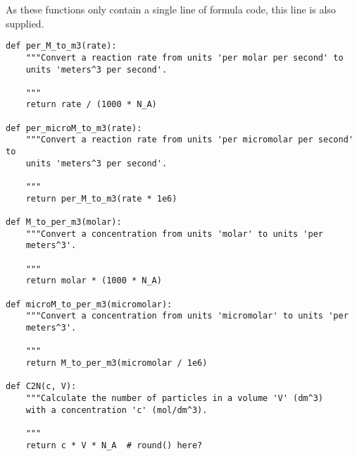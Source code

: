 \documentclass[a4paper,10pt]{article}
\begin{document}
As these functions only contain a single line of formula code, this line is also supplied.
\begin{verbatim}
def per_M_to_m3(rate):
    """Convert a reaction rate from units 'per molar per second' to 
    units 'meters^3 per second'.

    """
    return rate / (1000 * N_A)

def per_microM_to_m3(rate):
    """Convert a reaction rate from units 'per micromolar per second' to 
    units 'meters^3 per second'.

    """
    return per_M_to_m3(rate * 1e6)

def M_to_per_m3(molar):
    """Convert a concentration from units 'molar' to units 'per 
    meters^3'.

    """
    return molar * (1000 * N_A)

def microM_to_per_m3(micromolar):
    """Convert a concentration from units 'micromolar' to units 'per 
    meters^3'.

    """
    return M_to_per_m3(micromolar / 1e6) 

def C2N(c, V):
    """Calculate the number of particles in a volume 'V' (dm^3) 
    with a concentration 'c' (mol/dm^3).

    """
    return c * V * N_A  # round() here?
\end{verbatim}
\end{document}

